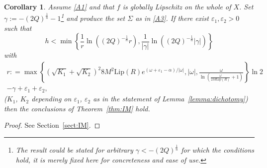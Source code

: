 \documentclass[a4paper, 12pt, oneside, reqno, notitlepage]{amsart}
\theoremstyle{plain}
\newtheorem{corollary}[theorem]{Corollary}
\theoremstyle{definition}
\theoremstyle{remark}
\newcommand{\lip}{\mathrm{Lip}}
\begin{document}
\begin{corollary} \label{corollary:smalldelays}
    Assume \ref{A1} and that $f$ is globally Lipschitz on the whole of $X$.
    Set  $\gamma  := -(2Q)^{\frac{1}{n}}-1$\footnote{The result could be stated for arbitrary $\gamma<-(2Q)^\frac{1}{n}$ for which the conditions hold, it is merely fixed here for concreteness and ease of use.} and produce the set $\Sigma$ as in \ref{A3}.
    If there exist $\varepsilon_1, \varepsilon_2 > 0$ such that 
    \begin{equation}
        h < \min \left\{ \frac{1}{r} \ln \left((2Q)^{-\frac{1}{n}} r \right), \frac{1}{|\gamma|} \ln \left((2Q)^{-\frac{1}{n}} |\gamma| \right)\right\}
        \label{eq:h_cond}
    \end{equation}
    with
    \begin{multline}
        r : = \max \left\{ \left(\sqrt{K_1} + \sqrt{K_2} \right)^2 8M^2  \lip(R)  e^{(\omega + \varepsilon_1 - \alpha)/|\omega|} , |\omega|, \frac{\omega}{\ln \left( \frac{\omega}{2M \lip(R)} + 1 \right)} \right\} \ln2 \\ -\gamma+ \varepsilon_1 + \varepsilon_2, \label{eq:r}
    \end{multline}
    ($K_1$, $K_2$ depending on $\varepsilon_1$, $\varepsilon_2$ as in the statement of Lemma~\ref{lemma:dichotomy}) then the conclusions of Theorem~\ref{thm:IM} hold.
\end{corollary}

\begin{proof}
    See Section~\ref{sect:IM}.
\end{proof}
\end{document}
